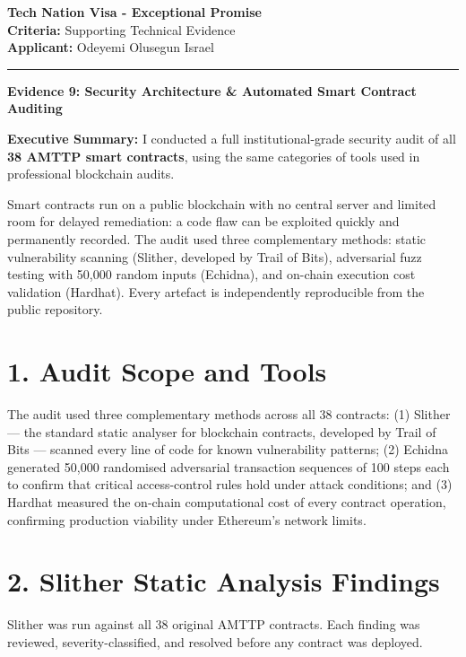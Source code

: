 \documentclass[11pt,a4paper]{article}
\begin{document}
\noindent\textbf{\Large Tech Nation Visa - Exceptional Promise}\\
\noindent\textbf{Criteria:} Supporting Technical Evidence\\
\noindent\textbf{Applicant:} Odeyemi Olusegun Israel\\
\rule{\textwidth}{0.4pt}

\vspace{0.1cm}
\begin{center}
    \textbf{\large Evidence 9: Security Architecture \& Automated Smart Contract Auditing}
\end{center}
\vspace{0.05cm}

\noindent\textbf{Executive Summary:} I conducted a full institutional-grade security audit of all \textbf{38 AMTTP smart contracts}, using the same categories of tools used in professional blockchain audits.

Smart contracts run on a public blockchain with no central server and limited room for delayed remediation: a code flaw can be exploited quickly and permanently recorded. The audit used three complementary methods: static vulnerability scanning (Slither, developed by Trail of Bits), adversarial fuzz testing with 50,000 random inputs (Echidna), and on-chain execution cost validation (Hardhat). Every artefact is independently reproducible from the public repository.

\section*{1. Audit Scope and Tools}
The audit used three complementary methods across all 38 contracts: (1) Slither --- the standard static analyser for blockchain contracts, developed by Trail of Bits --- scanned every line of code for known vulnerability patterns; (2) Echidna generated 50,000 randomised adversarial transaction sequences of 100 steps each to confirm that critical access-control rules hold under attack conditions; and (3) Hardhat measured the on-chain computational cost of every contract operation, confirming production viability under Ethereum's network limits.

\section*{2. Slither Static Analysis Findings}
Slither was run against all 38 original AMTTP contracts. Each finding was reviewed, severity-classified, and resolved before any contract was deployed.
\end{document}
